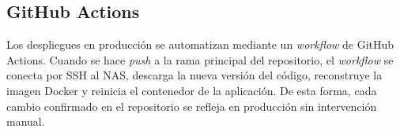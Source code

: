\subsection{GitHub Actions}

Los despliegues en producción se automatizan mediante un \textit{workflow} de GitHub Actions. Cuando se hace \textit{push} a la rama principal del repositorio, el \textit{workflow} se conecta por SSH al NAS, descarga la nueva versión del código, reconstruye la imagen Docker y reinicia el contenedor de la aplicación. De esta forma, cada cambio confirmado en el repositorio se refleja en producción sin intervención manual.